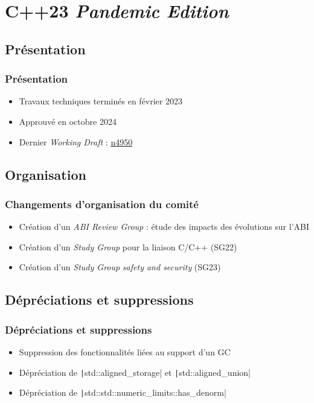 \documentclass[C++.tex]{subfiles}
\begin{document}
\section{C++23 \og{}\textit{Pandemic Edition}\fg{}}
\subsection*{Présentation}
\begin{frame}
	\frametitle{Présentation}
	\begin{itemize}
		\item Travaux techniques terminés en février 2023
		\item Approuvé en octobre 2024
		\item Dernier \textit{Working Draft} : \href{https://open-std.org/JTC1/SC22/WG21/docs/papers/2023/n4950.pdf}{n4950\linklogo}
	\end{itemize}
\end{frame}

\subsection*{Organisation}
\begin{frame}
	\frametitle{Changements d'organisation du comité}
	\begin{itemize}
		\item Création d'un \textit{ABI Review Group} : étude des impacts des évolutions sur l'ABI
		\item Création d'un \textit{Study Group} pour la liaison C/C++ (SG22)
		\item Création d'un \textit{Study Group} \textit{safety and security} (SG23)
	\end{itemize}
\end{frame}

\subsection*{Dépréciations et suppressions}
\begin{frame}[fragile]
	\frametitle{Dépréciations et suppressions}
	\begin{itemize}
		\item Suppression des fonctionnalités liées au support d'un GC
		\item Dépréciation de \texttt|std::aligned_storage| et \texttt|std::aligned_union|
		\item Dépréciation de \texttt|std::std::numeric_limits::has_denorm|
	\end{itemize}

\end{frame}
\end{document}
